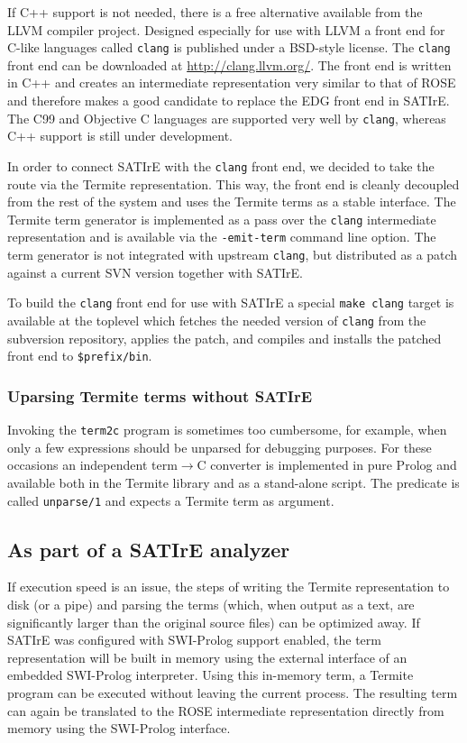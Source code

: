 \documentclass[10pt,twoside]{scrreprt}
\begin{document}
If C++ support is not needed, there is a free alternative available
from the LLVM compiler project. Designed especially for use with LLVM
a front end for C-like languages called \texttt{clang} is published
under a BSD-style license. The \texttt{clang} front end can be
downloaded at \url{http://clang.llvm.org/}. The front end is written
in C++ and creates an intermediate representation very similar to that
of ROSE and therefore makes a good candidate to replace the EDG front
end in SATIrE. The C99 and Objective C languages are supported very
well by \texttt{clang}, whereas C++ support is still under
development.

In order to connect SATIrE with the \texttt{clang} front end, we
decided to take the route via the Termite representation. This way,
the front end is cleanly decoupled from the rest of the system and
uses the Termite terms as a stable interface. The Termite term
generator is implemented as a pass over the \texttt{clang}
intermediate representation and is available via the
\verb|-emit-term| command line option. The term generator is not
integrated with upstream \texttt{clang}, but distributed as a patch
against a current SVN version together with SATIrE. 

To build the \texttt{clang} front end for use with SATIrE a special
\verb|make clang| target is available at the toplevel which fetches
the needed version of \texttt{clang} from the subversion repository,
applies the patch, and compiles and installs the patched front end to
\verb|$prefix/bin|.

\subsubsection{Uparsing Termite terms without SATIrE}
Invoking the \texttt{term2c} program is sometimes too cumbersome, for
example, when only a few expressions should be unparsed for debugging
purposes. For these occasions an independent term$\rightarrow$C
converter is implemented in pure Prolog and available both in the
Termite library and as a stand-alone script. The predicate is called
\verb|unparse/1| and expects a Termite term as argument.

\subsection{As part of a SATIrE analyzer}

If execution speed is an issue, the steps of writing the Termite
representation to disk (or a pipe) and parsing the terms (which, when
output as a text, are significantly larger than the original source
files) can be optimized away. If SATIrE was configured with SWI-Prolog
support enabled, the term representation will be built in memory using
the external interface of an embedded SWI-Prolog interpreter. Using
this in-memory term, a Termite program can be executed without leaving
the current process. The resulting term can again be translated to the
ROSE intermediate representation directly from memory using the
SWI-Prolog interface.
\end{document}
